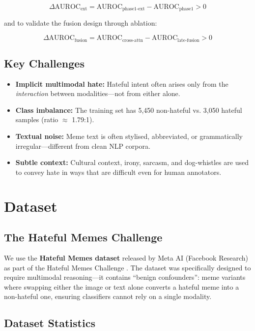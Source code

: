 \documentclass[12pt,a4paper]{article}
\begin{document}
\[
\Delta\text{AUROC}_{\text{ext}} = \text{AUROC}_{\text{phase1-ext}} - \text{AUROC}_{\text{phase1}} > 0
\]

and to validate the fusion design through ablation:

\[
\Delta\text{AUROC}_{\text{fusion}} = \text{AUROC}_{\text{cross-attn}} - \text{AUROC}_{\text{late-fusion}} > 0
\]

\subsection{Key Challenges}

\begin{itemize}
  \item \textbf{Implicit multimodal hate:} Hateful intent often arises only from the \textit{interaction} between modalities---not from either alone.
  \item \textbf{Class imbalance:} The training set has 5,450 non-hateful vs. 3,050 hateful samples (ratio $\approx$ 1.79:1).
  \item \textbf{Textual noise:} Meme text is often stylised, abbreviated, or grammatically irregular---different from clean NLP corpora.
  \item \textbf{Subtle context:} Cultural context, irony, sarcasm, and dog-whistles are used to convey hate in ways that are difficult even for human annotators.
\end{itemize}

\section{Dataset}

\subsection{The Hateful Memes Challenge}

We use the \textbf{Hateful Memes dataset} released by Meta AI (Facebook Research) as part of the Hateful Memes Challenge \cite{kiela2020hateful}. The dataset was specifically designed to require multimodal reasoning---it contains ``benign confounders'': meme variants where swapping either the image or text alone converts a hateful meme into a non-hateful one, ensuring classifiers cannot rely on a single modality.

\subsection{Dataset Statistics}
\end{document}
